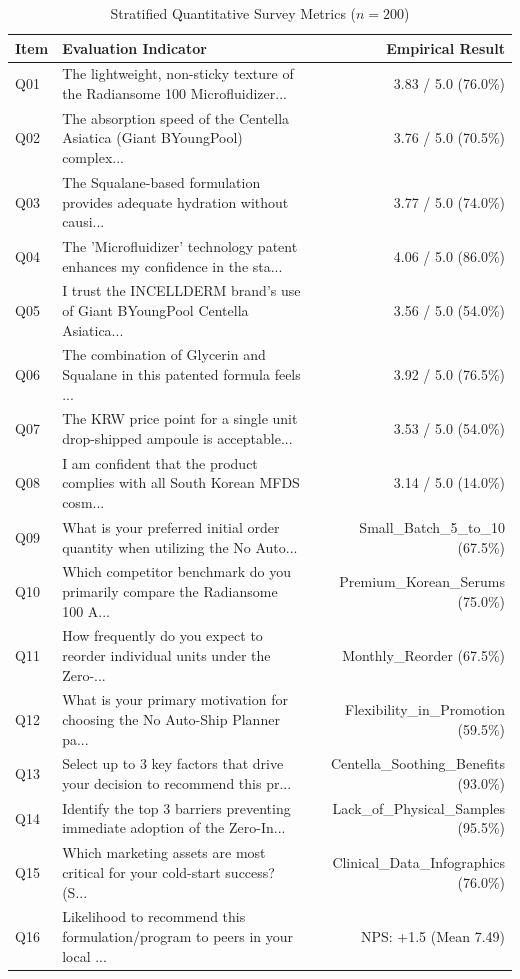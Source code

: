 \documentclass[10pt,twocolumn,a4paper]{article}
\begin{document}
\begin{table}[t]
\centering
\caption{Stratified Quantitative Survey Metrics ($n = 200$)}
\label{tab:metrics}
\small
\begin{tabularx}{\textwidth}{l X r}
\toprule
\textbf{Item} & \textbf{Evaluation Indicator} & \textbf{Empirical Result} \\
\midrule
Q01 & The lightweight, non-sticky texture of the Radiansome 100 Microfluidizer... & 3.83 / 5.0 (76.0\%) \\
Q02 & The absorption speed of the Centella Asiatica (Giant BYoungPool) complex... & 3.76 / 5.0 (70.5\%) \\
Q03 & The Squalane-based formulation provides adequate hydration without causi... & 3.77 / 5.0 (74.0\%) \\
Q04 & The 'Microfluidizer' technology patent enhances my confidence in the sta... & 4.06 / 5.0 (86.0\%) \\
Q05 & I trust the INCELLDERM brand's use of Giant BYoungPool Centella Asiatica... & 3.56 / 5.0 (54.0\%) \\
Q06 & The combination of Glycerin and Squalane in this patented formula feels ... & 3.92 / 5.0 (76.5\%) \\
Q07 & The KRW price point for a single unit drop-shipped ampoule is acceptable... & 3.53 / 5.0 (54.0\%) \\
Q08 & I am confident that the product complies with all South Korean MFDS cosm... & 3.14 / 5.0 (14.0\%) \\
Q09 & What is your preferred initial order quantity when utilizing the No Auto... & Small\_Batch\_5\_to\_10 (67.5\%) \\
Q10 & Which competitor benchmark do you primarily compare the Radiansome 100 A... & Premium\_Korean\_Serums (75.0\%) \\
Q11 & How frequently do you expect to reorder individual units under the Zero-... & Monthly\_Reorder (67.5\%) \\
Q12 & What is your primary motivation for choosing the No Auto-Ship Planner pa... & Flexibility\_in\_Promotion (59.5\%) \\
Q13 & Select up to 3 key factors that drive your decision to recommend this pr... & Centella\_Soothing\_Benefits (93.0\%) \\
Q14 & Identify the top 3 barriers preventing immediate adoption of the Zero-In... & Lack\_of\_Physical\_Samples (95.5\%) \\
Q15 & Which marketing assets are most critical for your cold-start success? (S... & Clinical\_Data\_Infographics (76.0\%) \\
Q16 & Likelihood to recommend this formulation/program to peers in your local ... & NPS: +1.5 (Mean 7.49) \\
\bottomrule
\end{tabularx}
\end{table}
\end{document}
